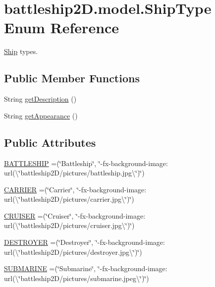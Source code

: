 \hypertarget{enumbattleship2D_1_1model_1_1ShipType}{\section{battleship2\-D.\-model.\-Ship\-Type Enum Reference}
\label{enumbattleship2D_1_1model_1_1ShipType}
}


\hyperlink{classbattleship2D_1_1model_1_1Ship}{Ship} types.  


\subsection*{Public Member Functions}
\begin{DoxyCompactItemize}
\item 
String \hyperlink{enumbattleship2D_1_1model_1_1ShipType_a76b27b28d4fc80ce17e5d3e3370281a0}{get\-Description} ()
\item 
String \hyperlink{enumbattleship2D_1_1model_1_1ShipType_ae18e6c6a04dfc1bf3aaca096c545921a}{get\-Appearance} ()
\end{DoxyCompactItemize}
\subsection*{Public Attributes}
\begin{DoxyCompactItemize}
\item 
\hyperlink{enumbattleship2D_1_1model_1_1ShipType_ab3cfa603543cb285e992850a6f7c954d}{B\-A\-T\-T\-L\-E\-S\-H\-I\-P} =(\char`\"{}Battleship\char`\"{}, \char`\"{}-\/fx-\/background-\/image\-: url(\textbackslash{}\char`\"{}battleship2\-D/pictures/battleship.\-jpg\textbackslash{}\char`\"{})\char`\"{})
\item 
\hyperlink{enumbattleship2D_1_1model_1_1ShipType_ab24d6f8e734fcdb708100c0ae4aaaf50}{C\-A\-R\-R\-I\-E\-R} =(\char`\"{}Carrier\char`\"{}, \char`\"{}-\/fx-\/background-\/image\-: url(\textbackslash{}\char`\"{}battleship2\-D/pictures/carrier.\-jpg\textbackslash{}\char`\"{})\char`\"{})
\item 
\hyperlink{enumbattleship2D_1_1model_1_1ShipType_ae1b8a67f35620be66e722436cc116a03}{C\-R\-U\-I\-S\-E\-R} =(\char`\"{}Cruiser\char`\"{}, \char`\"{}-\/fx-\/background-\/image\-: url(\textbackslash{}\char`\"{}battleship2\-D/pictures/cruiser.\-jpg\textbackslash{}\char`\"{})\char`\"{})
\item 
\hyperlink{enumbattleship2D_1_1model_1_1ShipType_afb73a729348c4ae84ea2e4d2ff1160de}{D\-E\-S\-T\-R\-O\-Y\-E\-R} =(\char`\"{}Destroyer\char`\"{}, \char`\"{}-\/fx-\/background-\/image\-: url(\textbackslash{}\char`\"{}battleship2\-D/pictures/destroyer.\-jpg\textbackslash{}\char`\"{})\char`\"{})
\item 
\hyperlink{enumbattleship2D_1_1model_1_1ShipType_a6a4a2e419cb22ff18555e82539251a9d}{S\-U\-B\-M\-A\-R\-I\-N\-E} =(\char`\"{}Submarine\char`\"{}, \char`\"{}-\/fx-\/background-\/image\-: url(\textbackslash{}\char`\"{}battleship2\-D/pictures/submarine.\-jpeg\textbackslash{}\char`\"{})\char`\"{})
\end{DoxyCompactItemize}
